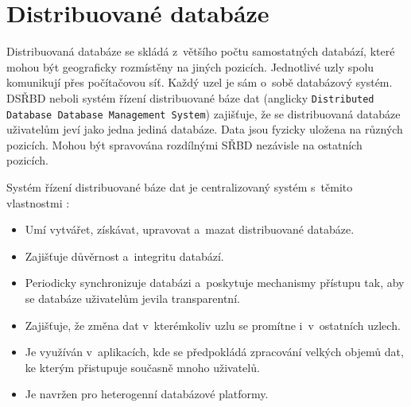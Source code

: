\section{Distribuované databáze}
Distribuovaná databáze se skládá z~většího počtu samostatných databází, které mohou být geograficky rozmístěny na jiných pozicích. Jednotlivé uzly spolu komunikují přes počítačovou síť. Každý uzel je sám o~sobě databázový systém. DSŘBD neboli systém řízení distribuované báze dat (anglicky \texttt{Distributed Database Database Management System}) zajišťuje, že se distribuovaná databáze uživatelům jeví jako jedna jediná databáze. Data jsou fyzicky uložena na různých pozicích. Mohou být spravována rozdílnými SŘBD nezávisle na ostatních pozicích.

\vspace{0.5cm}

\noindent Systém řízení distribuované báze dat je centralizovaný systém s~těmito vlastnostmi 
\cite{distributedDBMS}:

\begin{itemize}
\item Umí vytvářet, získávat, upravovat a~mazat distribuované databáze.

\item Zajišťuje důvěrnost a~integritu databází.

\item Periodicky synchronizuje databázi a~poskytuje mechanismy přístupu tak, aby se databáze uživatelům jevila transparentní.

\item Zajišťuje, že změna dat v~kterémkoliv uzlu se promítne i~v~ostatních uzlech.

\item Je využíván v~aplikacích, kde se předpokládá zpracování velkých objemů dat, ke kterým přistupuje současně mnoho uživatelů.

\item Je navržen pro heterogenní databázové platformy.
\end{itemize}

